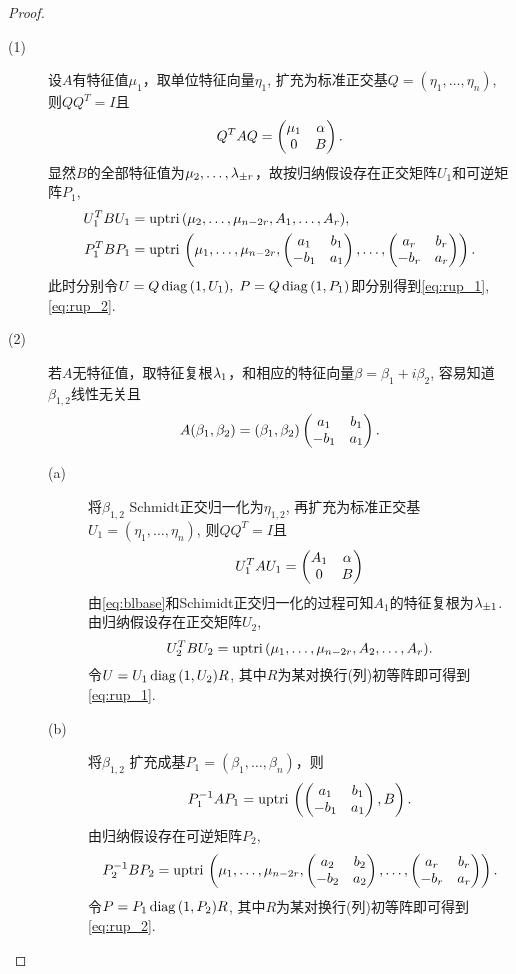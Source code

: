 \begin{proof}
	\begin{description}
	\item[(1)]
	设$A$有特征值$\mu_1$，取单位特征向量$\eta_1$, 扩充为标准正交基$Q=(\eta_1,\dots,\eta_n)$,
	则$QQ^T=I$且
	\[Q^T AQ=\begin{pmatrix} \mu_1 & \alpha\\ 0 & B\end{pmatrix}.\]
	显然$B$的全部特征值为$\mu_2,\dots,\lambda_{\pm r}$，故按归纳假设存在正交矩阵$U_1$和可逆矩阵$P_1$,
	\begin{align*}
		U_1^T B U_1&=\operatorname*{uptri\,}(\mu_2,\dots,\mu_{n-2r},A_1,\dots,A_r),\\
		P_1^T B P_1&=\operatorname*{uptri\,}\left(\mu_1,\dots,\mu_{n-2r},
		\begin{pmatrix} a_1 & b_1\\ -b_1 & a_1\end{pmatrix},\dots,\begin{pmatrix} a_r & b_r\\ -b_r & a_r\end{pmatrix}\right).
	\end{align*}
	此时分别令$U=Q\operatorname*{diag\,}(1,U_1),\;P=Q\operatorname*{diag\,}(1,P_1)$即分别得到\eqref{eq:rup_1}, \eqref{eq:rup_2}.
	\item[(2)]
	若$A$无特征值，取特征复根$\lambda_1$，和相应的特征向量$\beta=\beta_1+i\beta_2$, 容易知道$\beta_{1,2}$线性无关且
	\begin{equation}\label{eq:blbase}
	A(\beta_1,\beta_2)=(\beta_1,\beta_2)\begin{pmatrix} a_1 & b_1\\ -b_1 & a_1\end{pmatrix}.
	\end{equation}
	\begin{description}
		\item[(a)] 将$\beta_{1,2}$ Schmidt正交归一化为$\eta_{1,2}$, 再扩充为标准正交基$U_1=(\eta_1,\dots,\eta_n)$, 则$QQ^T=I$且
		\[U_1^T AU_1=\begin{pmatrix} A_1 & \alpha\\ 0 & B\end{pmatrix}\]
		由\eqref{eq:blbase}和Schimidt正交归一化的过程可知$A_1$的特征复根为$\lambda_{\pm 1}$. 
		由归纳假设存在正交矩阵$U_2$,
		\[U_2^T B U_2=\operatorname*{uptri\,}(\mu_1,\dots,\mu_{n-2r},A_2,\dots,A_r).\]
		令$U=U_1\operatorname*{diag\,}(1,U_2)R$, 其中$R$为某对换行(列)初等阵即可得到\eqref{eq:rup_1}.
		\item[(b)] 将$\beta_{1,2}$ 扩充成基$P_1=(\beta_1,\dots,\beta_n)$，则
		\[P_1^{-1} A P_1=\operatorname*{uptri\,}\left(\begin{pmatrix} a_1 & b_1\\ -b_1 & a_1\end{pmatrix},B\right).\]
		由归纳假设存在可逆矩阵$P_2$, 
		\[P_2^{-1} B P_2=\operatorname*{uptri\,}\left(\mu_1,\dots,\mu_{n-2r},
		\begin{pmatrix} a_2 & b_2\\ -b_2 & a_2\end{pmatrix},\dots,\begin{pmatrix} a_r & b_r\\ -b_r & a_r\end{pmatrix}\right).\]
		令$P=P_1\operatorname*{diag\,}(1,P_2)R$, 其中$R$为某对换行(列)初等阵即可得到\eqref{eq:rup_2}.
	\end{description}
	\end{description}
\end{proof}